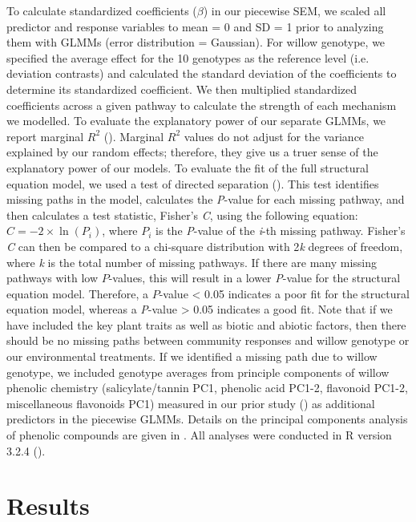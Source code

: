 \documentclass[11pt]{article}
\begin{document}
To calculate standardized coefficients ($\beta$) in our piecewise SEM, we scaled
all predictor and response variables to mean = 0 and SD = 1 prior to
analyzing them with GLMMs (error distribution = Gaussian). For willow
genotype, we specified the average effect for the 10 genotypes as the
reference level (i.e. deviation contrasts) and calculated the standard
deviation of the coefficients to determine its standardized coefficient.
We then multiplied standardized coefficients across a given pathway to
calculate the strength of each mechanism we modelled. To evaluate the
explanatory power of our separate GLMMs, we report marginal
\(R^2\) (\citealt{Nakagawa_2012}). Marginal \(R^2\) values do
not adjust for the variance explained by our random effects; therefore,
they give us a truer sense of the explanatory power of our models. To
evaluate the fit of the full structural equation model, we used a test
of directed separation (\citealt{shipley2000new}). This test identifies missing
paths in the model, calculates the \emph{P}-value for each missing
pathway, and then calculates a test statistic, Fisher's \emph{C}, using
the following equation: \(C=-2\times\ln\left(P_i\right)\), where \(P_i\) is the
\emph{P}-value of the \emph{i}-th missing pathway. Fisher's \emph{C} can
then be compared to a chi-square distribution with 2\emph{k} degrees of
freedom, where \emph{k} is the total number of missing pathways. If
there are many missing pathways with low $P$-values, this will result in a
lower \emph{P}-value for the structural equation model. Therefore, a
$P$-value \textless{} 0.05 indicates a poor fit for the structural
equation model, whereas a \emph{P}-value \textgreater{} 0.05 indicates a
good fit. Note that if we have included the key plant traits as well as
biotic and abiotic factors, then there should be no missing paths between community responses and willow genotype or our environmental treatments. If we identified a missing path due to willow genotype, we included genotype averages from principle components of willow phenolic chemistry (salicylate/tannin PC1, phenolic acid PC1-2, flavonoid PC1-2, miscellaneous flavonoids PC1) measured in our prior study (\citealt{Barbour_2015}) as additional predictors in the piecewise GLMMs. Details on the principal components analysis of phenolic compounds are given in \cite{Barbour_2015}. All analyses were conducted in R version 3.2.4 (\citealt{R2016}).
 

\section*{Results}
\end{document}
